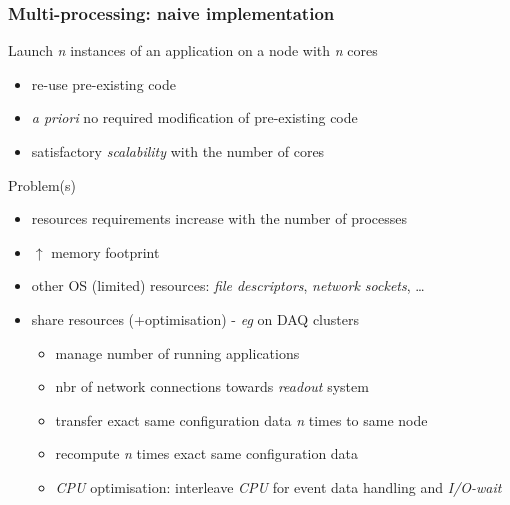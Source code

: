\documentclass[9pt]{beamer}
\begin{document}
\begin{frame}
  \frametitle{Multi-processing: naive implementation}

Launch \emph{n} instances of an application on a node with \emph{n} cores

\begin{itemize}
\item re-use pre-existing code
\item \emph{a priori} no required modification of pre-existing code
\item satisfactory \emph{scalability} with the number of cores
\end{itemize}

\begin{block}{Problem(s)}

\begin{itemize}
\item resources requirements increase with the number of processes
\item \alert{$\uparrow$ memory footprint}
\item other OS (limited) resources: \emph{file descriptors}, \emph{network sockets},
  \ldots{}
\item share resources (+optimisation) - \emph{eg} on DAQ clusters

  \begin{itemize}
  \item manage number of running applications
  \item nbr of network connections towards \emph{readout} system
  \item transfer exact same configuration data \emph{n} times to same node
  \item recompute \emph{n} times exact same configuration data
  \item \emph{CPU} optimisation: interleave \emph{CPU} for event data handling and \emph{I/O-wait}
  \end{itemize}
\end{itemize}
\end{block}
\end{frame}
\end{document}
